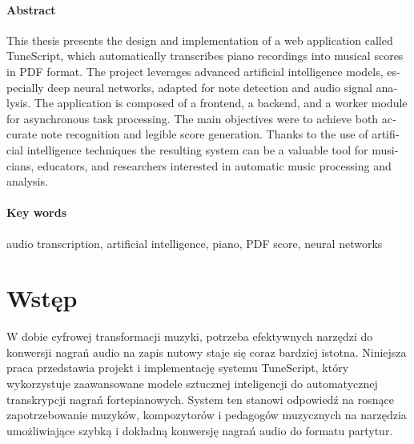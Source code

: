 \documentclass[a4paper,twoside,12pt]{book}
\newcounter{stronyPozaNumeracja}
\begin{document}
\subsubsection*{Abstract} 
\begin{otherlanguage}{british}
  This thesis presents the design and implementation of a web application called TuneScript, which automatically transcribes piano recordings into musical scores in PDF format. The project leverages advanced artificial intelligence models, especially deep neural networks, adapted for note detection and audio signal analysis. The application is composed of a frontend, a backend, and a worker module for asynchronous task processing. The main objectives were to achieve both accurate note recognition and legible score generation. Thanks to the use of artificial intelligence techniques the resulting system can be a valuable tool for musicians, educators, and researchers interested in automatic music processing and analysis.
\end{otherlanguage}

\subsubsection*{Key words}  
\begin{otherlanguage}{british}
  audio transcription, artificial intelligence, piano, PDF score, neural networks
\end{otherlanguage}




\tableofcontents

\setcounter{stronyPozaNumeracja}{\value{page}}
\mainmatter
\pagestyle{empty}

\cleardoublepage

\pagestyle{NumeryStronNazwyRozdzialow}


\chapter{Wstęp}
\label{ch:wstep}

W dobie cyfrowej transformacji muzyki, potrzeba efektywnych narzędzi do konwersji nagrań audio na zapis nutowy staje się coraz bardziej istotna. Niniejsza praca przedstawia projekt i implementację systemu TuneScript, który wykorzystuje zaawansowane modele sztucznej inteligencji do automatycznej transkrypcji nagrań fortepianowych. System ten stanowi odpowiedź na rosnące zapotrzebowanie muzyków, kompozytorów i pedagogów muzycznych na narzędzia umożliwiające szybką i dokładną konwersję nagrań audio do formatu partytur.
\end{document}
